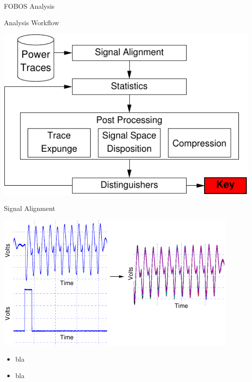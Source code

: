 \documentclass[final]{beamer}
\begin{document}
\begin{frame}[fragile]{}
\begin{columns}[t]
\begin{column}{.31\linewidth}
\begin{block}{FOBOS Analysis}
       \end{block}
       \begin{block}{Analysis Workflow}
        \begin{center}
          \includegraphics[scale=1.5]{../figures/data_anl}
        \end{center} 
       \end{block}
       \begin{block}{Signal Alignment}
        \begin{minipage}[t]{0.49\linewidth}
          \includegraphics[scale=2.0]{../figures/alignedTraces}
        \end{minipage}%
        \begin{minipage}[t]{0.49\linewidth}
         \begin{itemize}
           \item bla
           \item bla
         \end{itemize} 

\end{minipage}
\end{block}
\end{column}
\end{columns}
\end{frame}
\end{document}
